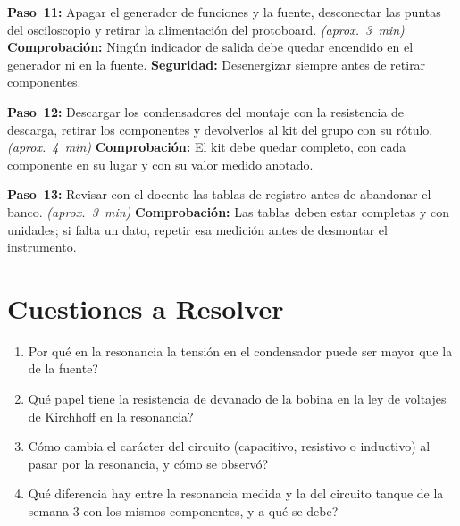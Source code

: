 \documentclass[12pt]{article}
\begin{document}
\begin{pasos}
  \item \textbf{Paso~11:} Apagar el generador de funciones y la fuente, desconectar las puntas del osciloscopio y retirar la alimentación del protoboard. \emph{(aprox.~\SI{3}{\minute})} \textbf{Comprobación:} Ningún indicador de salida debe quedar encendido en el generador ni en la fuente. \textbf{Seguridad:} Desenergizar siempre antes de retirar componentes.
  \item \textbf{Paso~12:} Descargar los condensadores del montaje con la resistencia de descarga, retirar los componentes y devolverlos al kit del grupo con su rótulo. \emph{(aprox.~\SI{4}{\minute})} \textbf{Comprobación:} El kit debe quedar completo, con cada componente en su lugar y con su valor medido anotado.
  \item \textbf{Paso~13:} Revisar con el docente las tablas de registro antes de abandonar el banco. \emph{(aprox.~\SI{3}{\minute})} \textbf{Comprobación:} Las tablas deben estar completas y con unidades; si falta un dato, repetir esa medición antes de desmontar el instrumento.
\end{pasos}

\section{Cuestiones a Resolver}\label{sec:cuestiones}
\begin{enumerate}
  \item \textquestiondown{}Por qué en la resonancia la tensión en el condensador puede ser mayor que la de la fuente?
  \item \textquestiondown{}Qué papel tiene la resistencia de devanado de la bobina en la ley de voltajes de Kirchhoff en la resonancia?
  \item \textquestiondown{}Cómo cambia el carácter del circuito (capacitivo, resistivo o inductivo) al pasar por la resonancia, y cómo se observó?
  \item \textquestiondown{}Qué diferencia hay entre la resonancia medida y la del circuito tanque de la semana 3 con los mismos componentes, y a qué se debe?
\end{enumerate}

\end{document}
